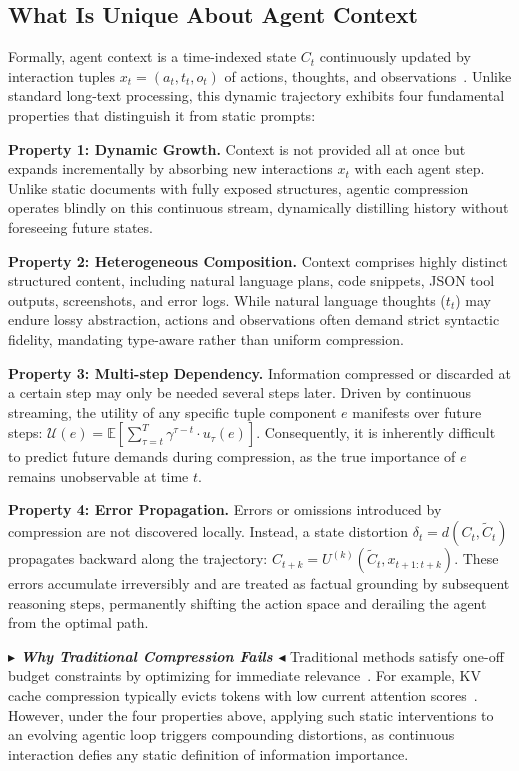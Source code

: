 \subsection{What Is Unique About Agent Context}
\label{subsec:what_is_unique}

Formally, agent context is a time-indexed state $C_t$ continuously updated by interaction tuples $x_t = (a_t, t_t, o_t)$ of actions, thoughts, and observations~\citep{yao2023reactsynergizingreasoningacting}. Unlike standard long-text processing, this dynamic trajectory exhibits four fundamental properties that distinguish it from static prompts:

\noindent\textbf{Property 1: Dynamic Growth.} Context is not provided all at once but expands incrementally by absorbing new interactions $x_t$ with each agent step. Unlike static documents with fully exposed structures, agentic compression operates blindly on this continuous stream, dynamically distilling history without foreseeing future states.

\noindent\textbf{Property 2: Heterogeneous Composition.} Context comprises highly distinct structured content, including natural language plans, code snippets, JSON tool outputs, screenshots, and error logs. While natural language thoughts ($t_t$) may endure lossy abstraction, actions and observations often demand strict syntactic fidelity, mandating type-aware rather than uniform compression.

\noindent\textbf{Property 3: Multi-step Dependency.} Information compressed or discarded at a certain step may only be needed several steps later. Driven by continuous streaming, the utility of any specific tuple component $e$ manifests over future steps: $\mathcal{U}(e) = \mathbb{E}\left[ \sum_{\tau = t}^{T} \gamma^{\tau - t} \cdot u_\tau(e) \right]$. Consequently, it is inherently difficult to predict future demands during compression, as the true importance of $e$ remains unobservable at time $t$.

\noindent\textbf{Property 4: Error Propagation.} Errors or omissions introduced by compression are not discovered locally. Instead, a state distortion $\delta_t = d(C_t, \tilde{C}_t)$ propagates backward along the trajectory: $C_{t+k} = U^{(k)}(\tilde{C}_t, x_{t+1:t+k})$. These errors accumulate irreversibly and are treated as factual grounding by subsequent reasoning steps, permanently shifting the action space and derailing the agent from the optimal path.

\vspace{1ex}
\noindent\textit{\textbf{$\blacktriangleright$ Why Traditional Compression Fails $\blacktriangleleft$}} Traditional methods satisfy one-off budget constraints by optimizing for immediate relevance~\citep{jiang-etal-2023-llmlingua, jiang2024longllmlinguaacceleratingenhancingllms}. For example, KV cache compression typically evicts tokens with low current attention scores~\citep{xiao2024efficientstreaminglanguagemodels, NEURIPS2024_28ab4182}. However, under the four properties above, applying such static interventions to an evolving agentic loop triggers compounding distortions, as continuous interaction defies any static definition of information importance.


